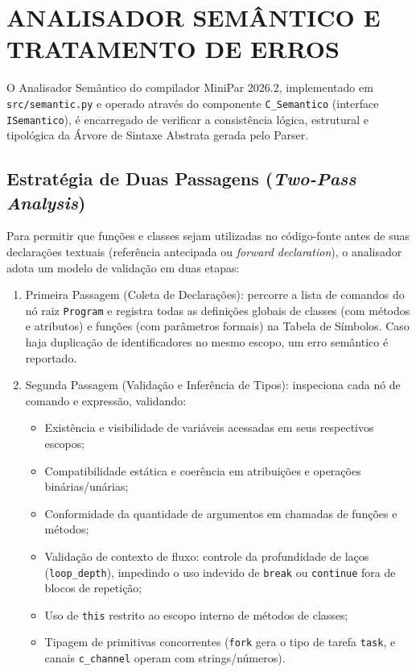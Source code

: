 \chapter{ANALISADOR SEMÂNTICO E TRATAMENTO DE ERROS}

O Analisador Semântico do compilador MiniPar 2026.2, implementado em \texttt{src/semantic.py} e operado através do componente \texttt{C\_Semantico} (interface \texttt{ISemantico}), é encarregado de verificar a consistência lógica, estrutural e tipológica da Árvore de Sintaxe Abstrata gerada pelo Parser.

\section{Estratégia de Duas Passagens (\textit{Two-Pass Analysis})}

Para permitir que funções e classes sejam utilizadas no código-fonte antes de suas declarações textuais (referência antecipada ou \textit{forward declaration}), o analisador adota um modelo de validação em duas etapas:
\begin{enumerate}
    \item Primeira Passagem (Coleta de Declarações): percorre a lista de comandos do nó raiz \texttt{Program} e registra todas as definições globais de classes (com métodos e atributos) e funções (com parâmetros formais) na Tabela de Símbolos. Caso haja duplicação de identificadores no mesmo escopo, um erro semântico é reportado.
    \item Segunda Passagem (Validação e Inferência de Tipos): inspeciona cada nó de comando e expressão, validando:
    \begin{itemize}
        \item Existência e visibilidade de variáveis acessadas em seus respectivos escopos;
        \item Compatibilidade estática e coerência em atribuições e operações binárias/unárias;
        \item Conformidade da quantidade de argumentos em chamadas de funções e métodos;
        \item Validação de contexto de fluxo: controle da profundidade de laços (\texttt{loop\_depth}), impedindo o uso indevido de \texttt{break} ou \texttt{continue} fora de blocos de repetição;
        \item Uso de \texttt{this} restrito ao escopo interno de métodos de classes;
        \item Tipagem de primitivas concorrentes (\texttt{fork} gera o tipo de tarefa \texttt{task}, e canais \texttt{c\_channel} operam com strings/números).
    \end{itemize}
\end{enumerate}


